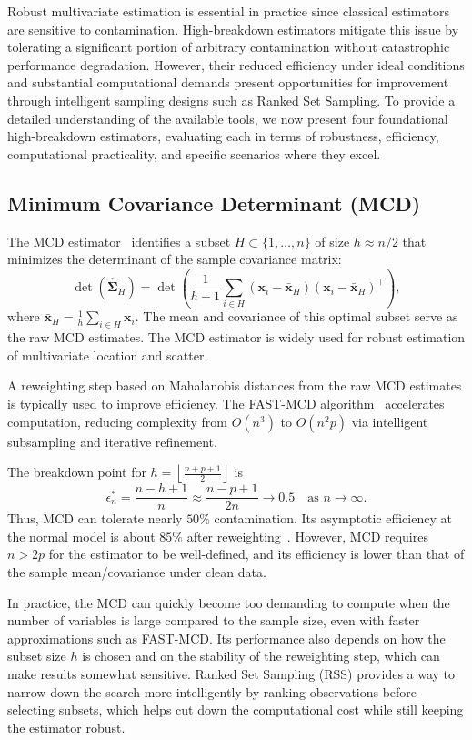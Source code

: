 \documentclass[12pt]{article}
\begin{document}
Robust multivariate estimation is essential in practice since classical estimators are sensitive to contamination. High-breakdown estimators mitigate this issue by tolerating a significant portion of arbitrary contamination without catastrophic performance degradation. However, their reduced efficiency under ideal conditions and substantial computational demands present opportunities for improvement through intelligent sampling designs such as Ranked Set Sampling. To provide a detailed understanding of the available tools, we now present four foundational high-breakdown estimators, evaluating each in terms of robustness, efficiency, computational practicality, and specific scenarios where they excel.

\subsection{Minimum Covariance Determinant (MCD)}
The MCD estimator~\cite{rousseeuw1999fast} identifies a subset $H \subset \{1, \ldots, n\}$ of size $h \approx n/2$ that minimizes the determinant of the sample covariance matrix:
\[
\det(\hat{\bm{\Sigma}}_H) = \det\left( \frac{1}{h - 1} \sum_{i \in H} (\mathbf{x}_i - \bar{\mathbf{x}}_H)(\mathbf{x}_i - \bar{\mathbf{x}}_H)^\top \right),
\]
where $\bar{\mathbf{x}}_H = \frac{1}{h} \sum_{i \in H} \mathbf{x}_i$. The mean and covariance of this optimal subset serve as the raw MCD estimates. The MCD estimator is widely used for robust estimation of multivariate location and scatter.

A reweighting step based on Mahalanobis distances from the raw MCD estimates is typically used to improve efficiency. The FAST-MCD algorithm~\cite{rousseeuw1999fast} accelerates computation, reducing complexity from $O(n^3)$ to $O(n^2p)$ via intelligent subsampling and iterative refinement.

The breakdown point for $h = \left\lfloor \frac{n + p + 1}{2} \right\rfloor$ is
\[
\epsilon^*_n = \frac{n - h + 1}{n} \approx \frac{n - p + 1}{2n} \rightarrow 0.5 \quad \text{as } n \to \infty.
\]
Thus, MCD can tolerate nearly $50\%$ contamination. Its asymptotic efficiency at the normal model is about $85\%$ after reweighting~\cite{maronna2019robust}. However, MCD requires $n > 2p$ for the estimator to be well-defined, and its efficiency is lower than that of the sample mean/covariance under clean data.

In practice, the MCD can quickly become too demanding to compute when the number of variables is large compared to the sample size, even with faster approximations such as FAST-MCD. Its performance also depends on how the subset size $h$ is chosen and on the stability of the reweighting step, which can make results somewhat sensitive. Ranked Set Sampling (RSS) provides a way to narrow down the search more intelligently by ranking observations before selecting subsets, which helps cut down the computational cost while still keeping the estimator robust.
\end{document}
